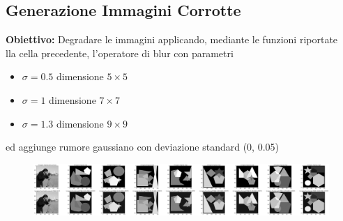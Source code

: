 \subsection{Generazione Immagini Corrotte}
\textbf{Obiettivo:}
Degradare le immagini applicando, mediante le funzioni riportate \\lla cella precedente,  l'operatore di blur con parametri
\begin{itemize}
    \item{$\sigma=0.5$ dimensione $5\times 5$}
    \item{$\sigma=1$ dimensione $7\times 7$}
    \item{$\sigma=1.3$ dimensione $9\times 9$}
\end{itemize}
ed aggiunge rumore gaussiano con deviazione standard (0, 0.05)

\begin{figure}[H]
    \centering
    \begin{minipage}[h]{\textwidth}
    \includegraphics[width=\linewidth]{output/tabCorrotte/imgcorr1.png}\label{fig:imgcorrotte1}
    \end{minipage}
    \begin{minipage}[h]{\textwidth}
        \centering
        

\end{minipage}
\end{figure}
